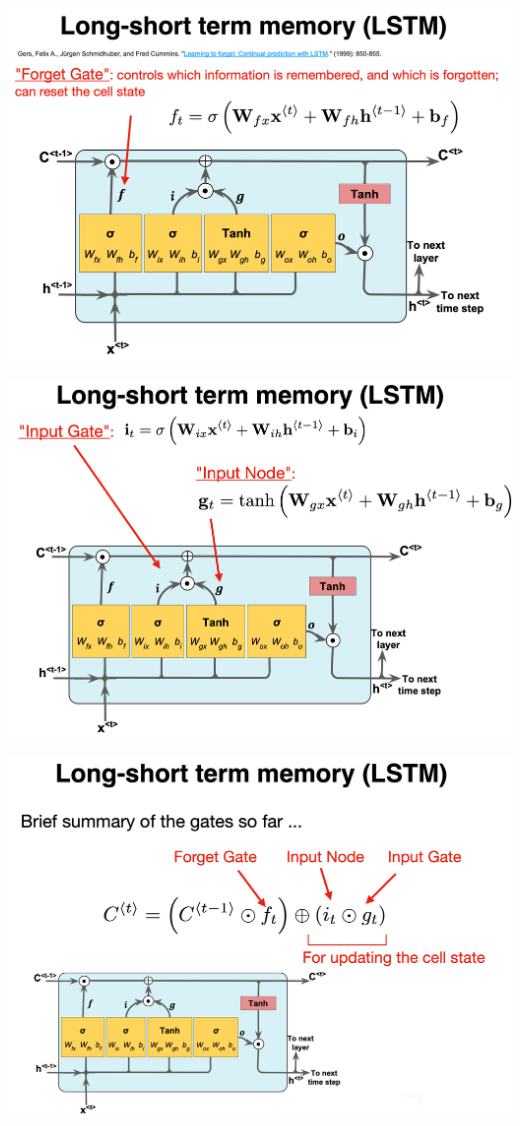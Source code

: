 \documentclass[%
oneside,                 %
final,                   %
10pt]{article}
\begin{document}
\vspace{6mm}

\vspace{6mm}

\centerline{\includegraphics[width=0.9\linewidth]{figslides/RNN18.png}}

\vspace{6mm}

\vspace{6mm}

\centerline{\includegraphics[width=0.9\linewidth]{figslides/RNN19.png}}

\vspace{6mm}

\vspace{6mm}

\centerline{\includegraphics[width=0.9\linewidth]{figslides/RNN20.png}}
\end{document}
